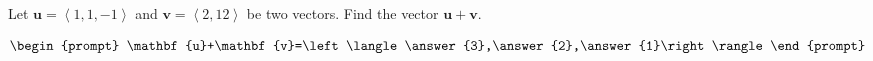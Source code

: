 \documentclass{ximera}
\author{Gregory Hartman \and Matthew Carr}
\begin{document}
\begin{exercise}




Let $\mathbf{u}=\left\langle1,1,-1\right\rangle$ and $\mathbf{v}=\left\langle2,12\right\rangle$ be two vectors. Find the vector $\mathbf{u}+\mathbf{v}$.

\[
\begin{prompt}
\mathbf{u}+\mathbf{v}=\left\langle\answer{3},\answer{2},\answer{1}\right\rangle
\end{prompt}
\]

\end{exercise}
\end{document}

